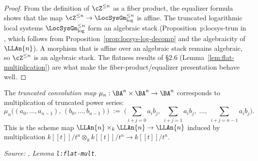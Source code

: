 \begin{proof}
  From the definition of $\cZ^{\leq n}$ as a fiber product, the equalizer
  formula shows that the map $\cZ^{\leq n} \to \LocSysGm_{\log}^{\leq n}$
  is affine. The truncated logarithmic local systems
  $\LocSysGm_{\log}^{\leq n}$ form an algebraic stack
  (Proposition~p:locsys-trun in \cite{hilburn-raskin}, which follows from
  Proposition~\ref{prop:locsys-log-decomp} and the algebraicity of
  $\LLAn{n}$). A morphism that is affine over an algebraic stack remains
  algebraic, so $\cZ^{\leq n}$ is an algebraic stack. The flatness results
  of \S2.6 (Lemma~\ref{lem:flat-multiplication}) are what make the
  fiber-product/equalizer presentation behave well.
\end{proof}

\begin{definition}
  \label{def:trunc-conv}
  The \emph{truncated convolution map} $\mu_n : \BA^n \times \BA^n \to \BA^n$
  corresponds to multiplication of truncated power series:
  \[
    \mu_n\bigl((a_0,\ldots,a_{n-1}),\,(b_0,\ldots,b_{n-1})\bigr)
    \;:=\; \Big(\sum_{i+j=0} a_i b_j,\; \sum_{i+j=1} a_i b_j,\; \ldots,\;
    \sum_{i+j=n-1} a_i b_j\Big).
  \]
  This is the scheme map $\LLAn{n} \times_k \LLAn{n} \to \LLAn{n}$ induced by
  multiplication $k[[t]]/t^n \otimes_k k[[t]]/t^n \to k[[t]]/t^n$.

  \textit{Source: \cite{hilburn-raskin}, Lemma \texttt{l:flat-mult}.}
\end{definition}

